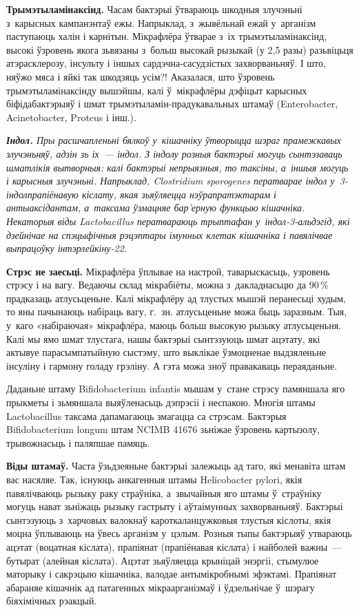 \textbf{Трымэтыламінаксінд.} Часам бактэрыі ўтвараюць шкодныя злучэньні з~карысных кампанэнтаў ежы. Напрыклад, з~жывёльнай ежай у~арганізм паступаюць халін і карнітын. Мікрафлёра ўтварае з~іх трымэтыламінаксінд, высокі ўзровень якога зьвязаны з~больш высокай рызыкай (у 2,5 разы) разьвіцьця атэрасклерозу, інсульту і іншых сардэчна-сасудзістых захворваньняў. І што, няўжо мяса і яйкі так шкодзяць усім?! Аказалася, што ўзровень трымэтыламінаксінду вышэйшы, калі ў~мікрафлёры дэфіцыт карысных біфідабактэрыяў і шмат трымэтыламін-прадукавальных штамаў (Enterobacter, Acinetobacter, Proteus і інш.).

\emph{\textbf{Індол.} Пры расшчапленьні бялкоў у~кішачніку ўтворыцца шэраг прамежкавых злучэньняў, адзін зь іх~--- індол. З індолу розныя бактэрыі могуць сынтэзаваць шматлікія вытворныя: калі бактэрыі непрыязныя, то таксіны, а~іншыя могуць і карысныя злучэньні. Напрыклад, Clostridium sporogenes ператварае індол у~3-індолпрапіёнавую кіслату, якая зьяўляецца нэўрапратэктарам і антыаксідантам, а~таксама ўзмацняе бар'ерную функцыю кішачніка. Некаторыя віды Lactobacillus ператвараюць трыптафан у~індол-3-альдэгід, які дзейнічае на спэцыфічныя рэцэптары імунных клетак кішачніка і павялічвае выпрацоўку інтэрлейкіну-22.}

\textbf{Стрэс не заесьці.} Мікрафлёра ўплывае на настрой, таварыскасьць, узровень стрэсу і на вагу. Ведаючы склад мікрабіёты, можна з~дакладнасьцю да 90\,\% прадказаць атлусьценьне. Калі мікрафлёру ад тлустых мышэй перанесьці худым, то яны пачынаюць набіраць вагу, г.~зн. атлусьценьне можа быць заразным. Тыя, у~каго «набіраючая» мікрафлёра, маюць больш высокую рызыку атлусьценьня. Калі мы ямо шмат тлустага, нашы бактэрыі сынтэзуюць шмат ацэтату, які актывуе парасымпатыйную сыстэму, што выклікае ўзмоцненае выдзяленьне інсуліну і гармону голаду грэліну. А гэта можа зноў правакаваць пераяданьне.

Даданьне штаму Bifidobacterium infantis мышам у~стане стрэсу памяншала яго прыкметы і зьмяншала выяўленасьць дэпрэсіі і неспакою. Многія штамы Lactobacillus таксама дапамагаюць змагацца са стрэсам. Бактэрыя Bifidobacterium longum штам NCIMB 41676 зьніжае ўзровень картызолу, трывожнасьць і паляпшае памяць.


\textbf{Віды штамаў.} Часта ўзьдзеяньне бактэрыі залежыць ад таго, які менавіта штам вас насяляе. Так, існуюць анкагенныя штамы Helicobacter pylori, якія павялічваюць рызыку раку страўніка, а~звычайныя яго штамы ў~страўніку могуць нават зьніжаць рызыку гастрыту і аўтаімунных захворваньняў. Бактэрыі сынтэзуюць з~харчовых валокнаў кароткаланцужковыя тлустыя кіслоты, якія моцна ўплываюць на ўвесь арганізм у~цэлым. Розныя тыпы бактэрыяў утвараюць ацэтат (воцатная кіслата), прапіянат (прапіёнавая кіслата) і найболей важны~--- бутырат (алейная кіслата). Ацэтат зьяўляецца крыніцай энэргіі, стымулюе маторыку і сакрэцыю кішачніка, валодае антымікробнымі эфэктамі. Прапіянат абараняе кішачнік ад патагенных мікраарганізмаў і ўдзельнічае ў~шэрагу біяхімічных рэакцый.

